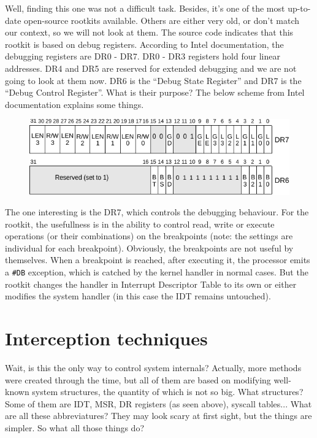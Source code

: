 \documentclass[12pt]{article}
\begin{document}
  Well, finding this one was not a difficult task. Besides, it's one of the
  most up-to-date open-source rootkits available. Others are either very old,
  or don't match our context, so we will not look at them. The source code
  indicates that this rootkit is based on debug registers. According to Intel
  documentation, the debugging registers are DR0 - DR7. DR0 - DR3 registers
  hold four linear addresses. DR4 and DR5 are reserved for extended debugging
  and we are not going to look at them now. DR6 is the ``Debug State
  Register'' and DR7 is the ``Debug Control Register''. What is their purpose?
  The below scheme from Intel documentation explains some things.
  \begin{figure}[h]
    \includegraphics[width=\linewidth, keepaspectratio]{dregs}
  \end{figure}
  The one interesting is the DR7, which controls the debugging behaviour. For
  the rootkit, the usefullness is in the ability to control read, write or
  execute operations (or their combinations) on the breakpoints (note: the
  settings are individual for each breakpoint). Obviously, the breakpoints are
  not useful by themselves. When a breakpoint is reached, after executing it,
  the processor emits a \verb!#DB! exception, which is catched by the kernel
  handler in normal cases. But the rootkit changes the handler in Interrupt
  Descriptor Table to its own or either modifies the system handler (in this
  case the IDT remains untouched).

  \section{Interception techniques}

  Wait, is this the only way to control system internals? Actually, more
  methods were created through the time, but all of them are based on
  modifying well-known system structures, the quantity of which is not so
  big. What structures? Some of them are IDT, MSR, DR registers (as seen
  above), syscall tables... What are all these abbreviatures? They may look
  scary at first sight, but the things are simpler. So what all those things
  do?
\end{document}
